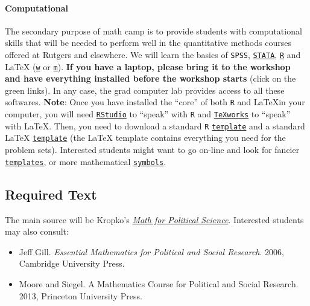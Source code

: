 \documentclass[10pt]{article}
\begin{document}
\paragraph{Computational} The secondary purpose of math camp is to provide students with computational skills that will be needed to perform well in the quantitative methods courses offered at Rutgers and elsewhere. We will learn the basics of \texttt{SPSS}, \href{http://gofile.me/2nH49/7vEyXRHW}{\texttt{STATA}}, \href{http://dirichlet.mat.puc.cl}{\texttt{R}} and \LaTeX \; (\href{http://ctan.math.utah.edu/ctan/tex-archive/systems/windows/protext/ProTeXt-3.1.4-020114.exe}{\texttt{w}} or \href{http://mirror.ctan.org/systems/mac/mactex/MacTeX.pkg}{\texttt{m}}). {\bf If you have a laptop, please bring it to the workshop and have everything installed before the workshop starts} (click on the green links). In any case, the grad computer lab provides access to all these softwares. {\bf Note}: Once you have installed the ``core'' of both \texttt{R} and \LaTeX \;in your computer, you will need \href{http://www.rstudio.com/products/rstudio/download/}{\texttt{RStudio}} to ``speak'' with \texttt{R} and \href{http://www.tug.org/texworks/#Getting_TeXworks}{\texttt{TeXworks}} to ``speak'' with \LaTeX. Then, you need to download a standard \texttt{R} \href{http://gofile.me/2nH49/JwZmDn7T}{\texttt{template}} and a standard \LaTeX \; \href{http://gofile.me/2nH49/5XGG4YEW}{\texttt{template}} (the \LaTeX \; template contains everything you need for the problem sets). Interested students might want to go on-line and look for fancier \href{https://www.writelatex.com/templates}{\texttt{templates}}, or more mathematical \href{http://www.maths.tcd.ie/~dwilkins/LaTeXPrimer/}{\texttt{symbols}}.


\subsection*{Required Text}
The main source will be Kropko's \href{http://gofile.me/2nH49/xw2IaabL}{\emph{Math for Political Science}}. Interested students may also consult:
\begin{itemize}
\item Jeff Gill. \emph{Essential Mathematics for Political and Social Research}. 2006, Cambridge University Press.
\item Moore and Siegel. A Mathematics Course for Political and Social Research. 2013, Princeton University Press.
\end{itemize}
\end{document}
